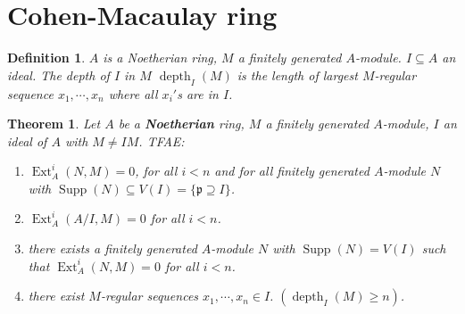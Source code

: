 \documentclass[cs4size]{article}
\newcommand{\su}{\subseteq}
\newcommand{\frp}{\mathfrak{p}}
\DeclareMathOperator{\Ext}{Ext}
\DeclareMathOperator{\Supp}{Supp}
\DeclareMathOperator{\depth}{depth}
\newtheorem{thm}{Theorem}
\newtheorem{definition}{Definition}
\begin{document}
\section{Cohen-Macaulay ring}
\begin{definition}
$A$ is a Noetherian ring, $M$ a finitely generated $A$-module. $I\su A$ an ideal. The depth of $I$ in $M$ $\depth_I(M)$ is the length of largest $M$-regular sequence $x_1,\cdots,x_n$ where all $x_i'$s are in $I$.
\end{definition}
\begin{thm}
Let $A$ be a \textbf{Noetherian} ring, $M$ a finitely generated $A$-module, $I$ an ideal of $A$ with $M\neq IM$. TFAE:
\begin{enumerate}
\item $\Ext_A^i(N,M)=0$, for all $i<n$ and for all finitely generated $A$-module $N$ with $\Supp (N)\su V(I)=\{\frp \supseteq I\}$.
\item $\Ext_A^i(A/I,M)=0$ for all $i<n$.
\item there exists a finitely generated $A$-module $N$ with $\Supp(N)=V(I)$ such that $\Ext_A^i(N,M)=0$ for all $i<n$.
\item there exist $M$-regular sequences $x_1,\cdots,x_n\in I$. $(\depth_I(M)\geq n)$.
\end{enumerate}
\end{thm}
\end{document}

